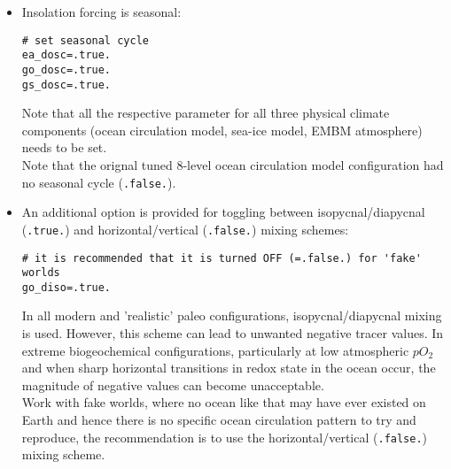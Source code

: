 \documentclass[11pt,fleqn]{book} %
\begin{document}
\begin{itemize}[noitemsep]
\begin{itemize}[noitemsep]
\item Insolation forcing is seasonal:
\small\vspace{-2pt}\begin{verbatim}
# set seasonal cycle
ea_dosc=.true.
go_dosc=.true.
gs_dosc=.true.
\end{verbatim}\vspace{-2pt}\normalsize
Note that all the respective parameter for all three physical climate components (ocean circulation model, sea-ice model, EMBM atmosphere) needs to be set.
\\Note that the orignal tuned 8-level ocean circulation model configuration had no seasonal cycle (\texttt{.false.}).
\vspace{1mm}
\item An additional option is provided for toggling between isopycnal/diapycnal (\texttt{.true.}) and horizontal/vertical (\texttt{.false.}) mixing schemes:
\small\vspace{-2pt}\begin{verbatim}
# it is recommended that it is turned OFF (=.false.) for 'fake' worlds
go_diso=.true.
\end{verbatim}\vspace{-2pt}\normalsize
In all modern and 'realistic' paleo configurations, isopycnal/diapycnal mixing is used. However, this scheme can lead to unwanted negative tracer values. In extreme biogeochemical configurations, particularly at low atmospheric \(pO_{2}\) and when sharp horizontal transitions in redox state in the ocean occur, the magnitude of negative values can become unacceptable.
\\Work with fake worlds, where no ocean like that may have ever existed on Earth and hence there is no specific ocean circulation pattern to try and reproduce, the recommendation is to use the horizontal/vertical (\texttt{.false.}) mixing scheme.
\end{itemize}
\vspace{1mm}


\end{itemize}
\end{document}
